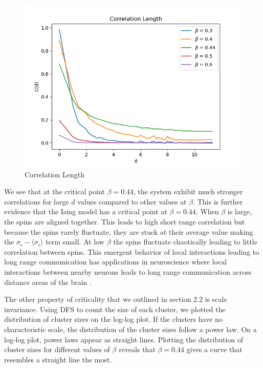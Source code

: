\documentclass{article}
\begin{document}
\begin{figure}[ht]
    \includegraphics[width=\columnwidth]{plots/corr_len.png}
    \caption{Correlation Length}
    \label{fig:5}
\end{figure}
We see that at the critical point $\beta = 0.44$, the system exhibit much stronger correlations for large $d$ values
compared to other values at $\beta$. This is further evidence that the Ising model has a critical point at $\beta = 0.44$.
When $\beta$ is large, the spins are aligned together. This leads to high short range correlation but because the spins rarely fluctuate, 
they are stuck at their average value making the $\sigma_i - \langle \sigma_i \rangle$ term small. At low $\beta$ the spins fluctuate chaotically 
leading to little correlation between spins. This emergent behavior of local interactions leading to long range communication has applications in
neuroscience where local interactions between nearby neurons leads to long range communication across distance areas of the brain \cite{Avramiea2022}.

The other property of criticality that we outlined in section 2.2 is scale invariance. 
Using DFS to count the size of each cluster, we plotted the distribution of cluster sizes on the log-log plot. 
If the clusters have no characteristic scale, the distribution of the cluster sizes follow a power law. 
On a log-log plot, power laws appear as straight lines. Plotting the distribution of cluster sizes for different
values of $\beta$ reveals that $\beta = 0.44$ gives a curve that resembles a straight line the most.
\end{document}

